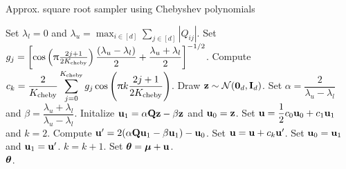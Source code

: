\documentclass[nohypdvips,onefignum,onetabnum]{siamart171218}
\begin{document}
\begin{algorithm}
\caption{Approx. square root sampler using Chebyshev polynomials}
\label{algo:Chebychev}
\begin{algorithmic}[1] 
\State Set $\lambda_l = 0$ and $\lambda_u = \displaystyle\max_{i \in [d]} \sum_{j \in [d]} |Q_{ij}|$.
\Comment{\textcolor{green}{Do the change of interval.}}
\State Set $g_j = \left[\cos\left(\uppi\frac{2j+1}{2K_{\mathrm{cheby}}}\right)\dfrac{(\lambda_u-\lambda_l)}{2} + \dfrac{\lambda_u+\lambda_l}{2}\right]^{-1/2}$. 
\EndFor
{}
  \State Compute $c_k = \dfrac{2}{K_{\mathrm{cheby}}} \displaystyle \sum_{j=0}^{K_{\mathrm{cheby}}} g_j \cos\left(\uppi k\frac{2j+1}{2K_{\mathrm{cheby}}}\right)$. 
\EndFor
  \State Draw $\mathbf{z} \sim \mathcal{N}(\mathbf{0}_d,\mathbf{I}_d)$.
  \State Set $\alpha = \dfrac{2}{\lambda_u-\lambda_l}$ and $\beta = \dfrac{\lambda_u+\lambda_l}{\lambda_u-\lambda_l}$.
  \State Initalize $\mathbf{u}_1 = \alpha\mathbf{Q z} - \beta\mathbf{z}$ and $\mathbf{u}_0 = \mathbf{z}$. 
  \State Set $\mathbf{u} = \dfrac{1}{2}c_0\mathbf{u}_0 + c_1\mathbf{u}_1$ and $k=2$.
   
    \State Compute $\mathbf{u}' = 2(\alpha\mathbf{Q}\mathbf{u}_1 - \beta\mathbf{u}_1) - \mathbf{u}_0$.
    \State Set $\mathbf{u} = \mathbf{u} + c_k\mathbf{u}'$.
    \State Set $\mathbf{u}_0 = \mathbf{u}_1$ and $\mathbf{u}_1 = \mathbf{u}'$.
    \State $k = k + 1$.
  \EndWhile
  \State Set $\boldsymbol{\theta}= \boldsymbol{\mu} + \mathbf{u}$. \Comment{\textcolor{green}{Build the Gaussian vector of interest.}}\\ 
\Return $\boldsymbol{\theta}$.



\end{algorithmic}
\end{algorithm}
\end{document}
